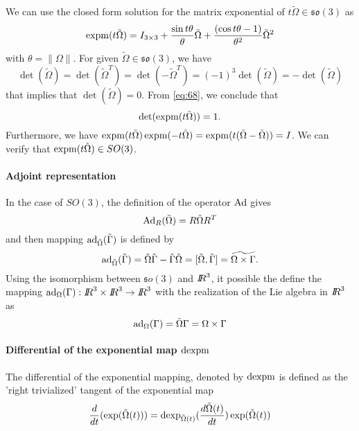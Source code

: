 We can use the closed form solution for the matrix exponential of $t \tilde\Omega  \in \mathfrak{so}(3)$ as
\begin{equation}
  \label{eq:68}
  \operatorname{expm}(t\tilde\Omega) = I_{3\times 3} + \frac{\sin{t\theta}} {\theta}  \tilde\Omega  +  \frac{(\cos{t \theta}-1)}{\theta^2} \tilde\Omega^2   
\end{equation}
with $\theta = \|\Omega\|$.
For given  $\tilde \Omega \in\mathfrak{so}(3)$, we have
\begin{equation}
  \label{eq:69}
  \det(\tilde \Omega) = \det(\tilde \Omega^T) = \det (-\tilde \Omega^T) = (-1)^3 \det(\tilde \Omega ) = - \det (\tilde \Omega )
\end{equation}
that implies that $\det(\tilde \Omega ) =0 $. From \eqref{eq:68}, we conclude that
\begin{equation}
  \label{eq:70}
  \det( \operatorname{expm}(t\tilde \Omega)) = 1.
\end{equation}
Furthermore, we have $\operatorname{expm}(t\tilde \Omega)\operatorname{expm}( -t\tilde \Omega) = \operatorname{expm}(t(\tilde \Omega-\tilde \Omega)) = I$. We can verify  that  $\operatorname{expm}(t\tilde \Omega) \in SO(3)$.

\paragraph{Adjoint representation}
In the case of $SO(3)$, the definition of the operator $\operatorname{Ad}$ gives
\begin{equation}
  \label{eq:121}
  \operatorname{Ad}_R(\tilde\Omega)  = R \tilde\Omega R^T
\end{equation}
 and then mapping $\operatorname{ad}_{\tilde\Omega}(\tilde \Gamma)$ is defined by
\begin{equation}
  \label{eq:56}
  \operatorname{ad}_{\tilde\Omega}(\tilde\Gamma) = \tilde \Omega \tilde\Gamma - \tilde \Gamma \tilde\Omega  =  [\tilde \Omega,\tilde \Gamma] = \widetilde{\Omega \times \Gamma}.
\end{equation}
Using the isomorphism between $\mathfrak so(3)$ and $\mbox{\rm $I\!\!R$}^3$, it possible the define the mapping $\operatorname{ad}_{\Omega}(\Gamma) : \mbox{\rm $I\!\!R$}^3\times\mbox{\rm $I\!\!R$}^3 \rightarrow \mbox{\rm $I\!\!R$}^3$ with the realization of the Lie algebra in $\mbox{\rm $I\!\!R$}^3$ as
\begin{equation}
  \label{eq:55}
  \operatorname{ad}_\Omega(\Gamma) = \tilde\Omega \Gamma = \Omega\times\Gamma
\end{equation}

\paragraph{Differential of the exponential map $\operatorname{dexpm}$}
The differential of the exponential mapping, denoted by $\operatorname{dexpm}$ is defined as the 'right trivialized' tangent of the exponential map 
\begin{equation}
  \label{eq:71}
  \frac{d}{dt} (\exp(\tilde \Omega(t))) = \operatorname{dexp}_{\tilde\Omega(t)}(\frac{d \tilde{\Omega}(t)}{dt}) \exp(\tilde\Omega(t))
\end{equation}



